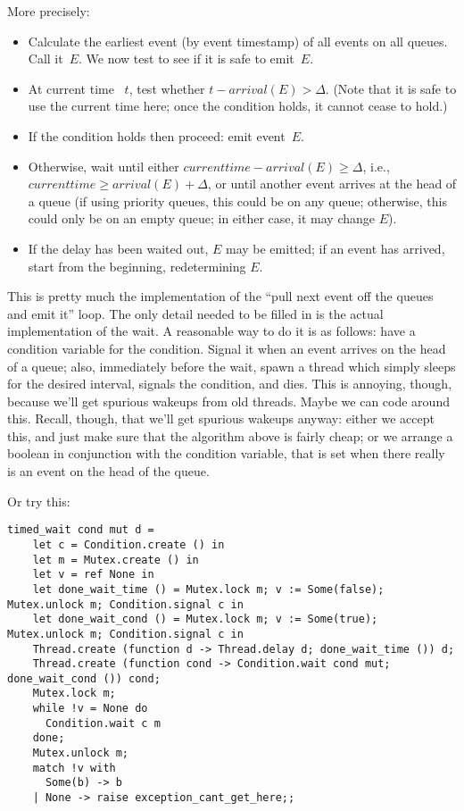\documentclass{article}
\begin{document}
More precisely:
\begin{itemize}
\item Calculate the earliest event (by event timestamp) of all events on all
queues.  Call it~$E$.  We now test to see if it is safe to emit~$E$.
\item At current time ~$t$, test whether
$t-\mathit{arrival}(E)>\Delta$.  (Note that it is safe to use the
current time here; once the condition holds, it cannot cease to hold.)
\item If the condition holds then proceed: emit event~$E$.
\item Otherwise, wait until either $\mathit{currenttime}-\mathit{arrival}(E)\geq\Delta$,
i.e., $\mathit{currenttime} \geq \mathit{arrival}(E)+\Delta$, or
until another event arrives at the head of a queue (if using priority
queues, this could be on any queue; otherwise, this could only be on
an empty queue; in either case, it may change $E$).
\item If the delay has been waited out, $E$ may be emitted; if an
event has arrived, start from the beginning, redetermining $E$.
\end{itemize}

This is pretty much the implementation of the ``pull next event off
the queues and emit it'' loop.  The only detail needed to be filled in
is the actual implementation of the wait.  A reasonable way to do it
is as follows: have a condition variable for the condition.  Signal it
when an event arrives on the head of a queue; also, immediately before
the wait, spawn a thread which simply sleeps for the desired interval,
signals the condition, and dies.  This is annoying, though, because
we'll get spurious wakeups from old threads.  Maybe we can code around
this.  Recall, though, that we'll get spurious wakeups anyway: either
we accept this, and just make sure that the algorithm above is fairly
cheap; or we arrange a boolean in conjunction with the condition
variable, that is set when there really is an event on the head of the
queue.

Or try this:
\newpage
\begin{verbatim}
timed_wait cond mut d =
    let c = Condition.create () in
    let m = Mutex.create () in
    let v = ref None in
    let done_wait_time () = Mutex.lock m; v := Some(false); Mutex.unlock m; Condition.signal c in
    let done_wait_cond () = Mutex.lock m; v := Some(true); Mutex.unlock m; Condition.signal c in
    Thread.create (function d -> Thread.delay d; done_wait_time ()) d;
    Thread.create (function cond -> Condition.wait cond mut; done_wait_cond ()) cond;
    Mutex.lock m;
    while !v = None do
      Condition.wait c m
    done;
    Mutex.unlock m;
    match !v with
      Some(b) -> b
    | None -> raise exception_cant_get_here;;
\end{verbatim}
\end{document}
